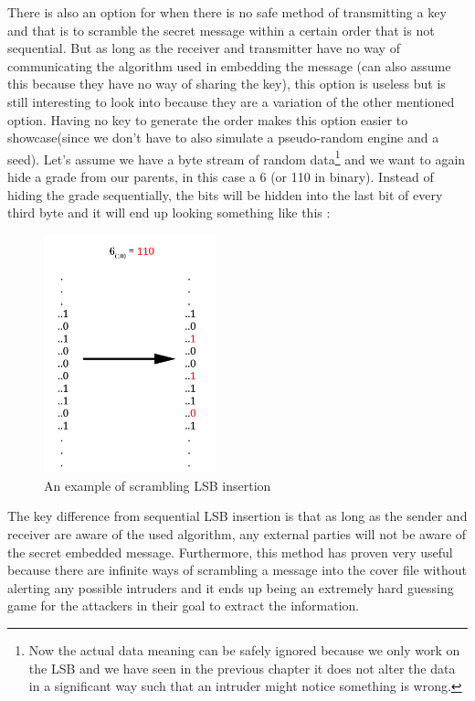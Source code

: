 \begin{multicols*}{2}
There is also an option for when there is no safe method of transmitting a key and that is to scramble the secret message within a certain order that is not sequential. But as long as the receiver and transmitter have no way of communicating the algorithm used in embedding the message (can also assume this because they have no way of sharing the key), this option is useless but is still interesting to look into because they are a variation of the other mentioned option. Having no key to generate the order makes this option easier to showcase(since we don't have to also simulate a pseudo-random engine and a seed). Let's assume we have a byte stream of random data\footnote{Now the actual data meaning can be safely ignored because we only work on the LSB and we have seen in the previous chapter it does not alter the data in a significant way such that an intruder might notice something is wrong.} and we want to again hide a grade from our parents, in this case a 6 (or 110 in binary). Instead of hiding the grade sequentially, the bits will be hidden into the last bit of every third byte and it will end up looking something like this :

\begin{figure}[H]
    \centering
    \includegraphics[width=5cm,keepaspectratio]{pics/scrambling_example}
    \caption{An example of scrambling LSB insertion}
    \label{Scrambled LSB}
\end{figure}

The key difference from sequential LSB insertion is that as long as the sender and receiver are aware of the used algorithm, any external parties will not be aware of the secret embedded message. Furthermore, this method has proven very useful because there are infinite ways of scrambling a message into the cover file without alerting any possible intruders and it ends up being an extremely hard guessing game for the attackers in their goal to extract the information.


\end{multicols*}
